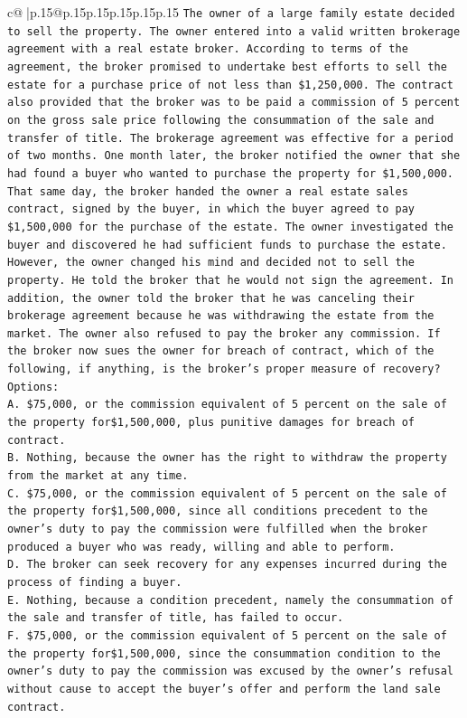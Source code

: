 \documentclass{article}
\begin{document}
{\begin{supertabular}{c@{$\;$}|p{.15\linewidth}@{}p{.15\linewidth}p{.15\linewidth}p{.15\linewidth}p{.15\linewidth}p{.15\linewidth}}
{{{\texttt{The owner of a large family estate decided to sell the property. The owner entered into a valid written brokerage agreement with a real estate broker. According to terms of the agreement, the broker promised to undertake best efforts to sell the estate for a purchase price of not less than \$1,250,000. The contract also provided that the broker was to be paid a commission of 5 percent on the gross sale price following the consummation of the sale and transfer of title. The brokerage agreement was effective for a period of two months. One month later, the broker notified the owner that she had found a buyer who wanted to purchase the property for \$1,500,000. That same day, the broker handed the owner a real estate sales contract, signed by the buyer, in which the buyer agreed to pay \$1,500,000 for the purchase of the estate. The owner investigated the buyer and discovered he had sufficient funds to purchase the estate. However, the owner changed his mind and decided not to sell the property. He told the broker that he would not sign the agreement. In addition, the owner told the broker that he was canceling their brokerage agreement because he was withdrawing the estate from the market. The owner also refused to pay the broker any commission. If the broker now sues the owner for breach of contract, which of the following, if anything, is the broker's proper measure of recovery?} \\
\texttt{Options:} \\
\texttt{A. \$75,000, or the commission equivalent of 5 percent on the sale of the property for\$1,500,000, plus punitive damages for breach of contract.} \\
\texttt{B. Nothing, because the owner has the right to withdraw the property from the market at any time.} \\
\texttt{C. \$75,000, or the commission equivalent of 5 percent on the sale of the property for\$1,500,000, since all conditions precedent to the owner's duty to pay the commission were fulfilled when the broker produced a buyer who was ready, willing and able to perform.} \\
\texttt{D. The broker can seek recovery for any expenses incurred during the process of finding a buyer.} \\
\texttt{E. Nothing, because a condition precedent, namely the consummation of the sale and transfer of title, has failed to occur.} \\
\texttt{F. \$75,000, or the commission equivalent of 5 percent on the sale of the property for\$1,500,000, since the consummation condition to the owner's duty to pay the commission was excused by the owner's refusal without cause to accept the buyer's offer and perform the land sale contract.} \\
}}}
\end{supertabular}}
\end{document}
